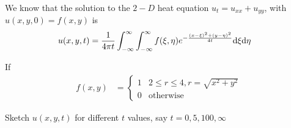 \item We know that the solution to the $2-D$ heat equation
$u_t = u_{xx} + u_{yy}$, with $u(x, y, 0) = f(x, y)$ is
%
\begin{align}
  u(x, y, t)
  & = \frac{1}{4 \pi t} \int^\infty_{-\infty} \int^\infty_{-\infty}
  f(\xi, \eta) e^{-\frac{(x - \xi)^2 + (y - \eta)^2}{4t}} \text d\xi \text d\eta
\end{align}

If
%
\begin{align}
  f(x, y) & =
  \begin{cases}
    1 & 2 \leq r \leq 4, r = \sqrt{x^2 + y^2}\\
    0 & \text{otherwise}
  \end{cases}
\end{align}

Sketch $u(x, y, t)$ for different $t$ values, say $t = 0, 5, 100, \infty$
\bigbreak
